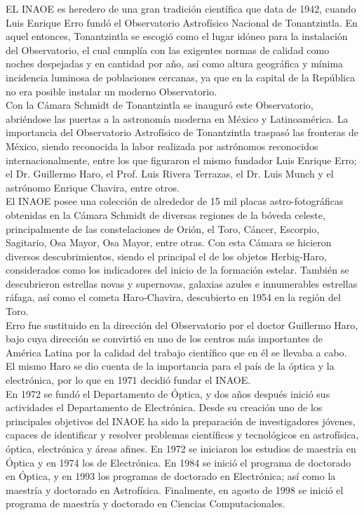 EL INAOE es heredero de una gran tradición científica que data de 1942, cuando Luis Enrique Erro fundó el Observatorio Astrofísico Nacional de Tonantzintla. En aquel entonces, Tonantzintla se escogió como el lugar idóneo para la instalación del Observatorio, el cual cumplía con las exigentes normas de calidad como noches despejadas y en cantidad por año, así como altura geográfica y mínima incidencia luminosa de poblaciones cercanas, ya que en la capital de la República no era posible instalar un moderno Observatorio.
\\

Con la Cámara Schmidt de Tonantzintla se inauguró este Observatorio, abriéndose las puertas a la astronomía moderna en México y Latinoamérica. La importancia del Observatorio Astrofísico de Tonantzintla traspasó las fronteras de México, siendo reconocida la labor realizada por astrónomos reconocidos internacionalmente, entre los que figuraron el mismo fundador Luis Enrique Erro; el Dr. Guillermo Haro, el Prof. Luis Rivera Terrazas, el Dr. Luis Munch y el astrónomo Enrique Chavira, entre otros.
\\
 
El INAOE posee una colección de alrededor de 15 mil placas astro-fotográficas obtenidas en la Cámara Schmidt de diversas regiones de la bóveda celeste, principalmente de las constelaciones de Orión, el Toro, Cáncer, Escorpio, Sagitario, Osa Mayor, Osa Mayor, entre otras. Con esta Cámara se hicieron diversos descubrimientos, siendo el principal el de los objetos Herbig-Haro, considerados como los indicadores del inicio de la formación estelar. También se descubrieron estrellas novas y supernovas, galaxias azules e innumerables estrellas ráfaga, así como el cometa Haro-Chavira, descubierto en 1954 en la región del Toro.
\\
  
Erro fue sustituido en la dirección del Observatorio por el doctor Guillermo Haro, bajo cuya dirección se convirtió en uno de los centros más importantes de América Latina por la calidad del trabajo científico que en él se llevaba a cabo. El mismo Haro se dio cuenta de la importancia para el país de la óptica y la electrónica, por lo que en 1971 decidió fundar el INAOE.
\\
 
En 1972 se fundó el Departamento de Óptica, y dos años después inició sus actividades el Departamento de Electrónica. Desde su creación uno de los principales objetivos del INAOE ha sido la preparación de investigadores jóvenes, capaces de identificar y resolver problemas científicos y tecnológicos en astrofísica, óptica, electrónica y áreas afines. En 1972 se iniciaron los estudios de maestría en Óptica y en 1974 los de Electrónica. En 1984 se inició el programa de doctorado en Óptica, y en 1993 los programas de doctorado en Electrónica; así como la maestría y doctorado en Astrofísica. Finalmente, en agosto de 1998 se inició el programa de maestría y doctorado en Ciencias Computacionales.
\\
  
